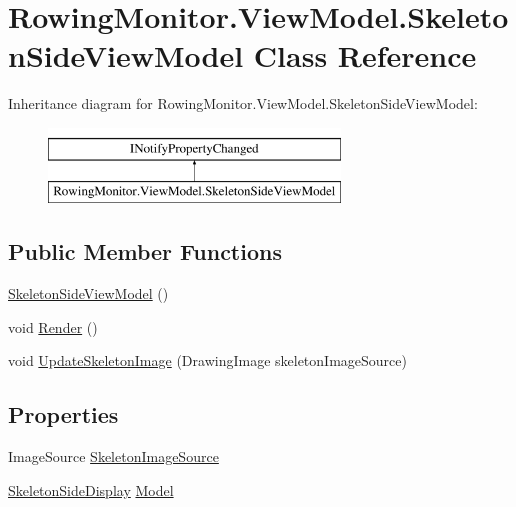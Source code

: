 \hypertarget{class_rowing_monitor_1_1_view_model_1_1_skeleton_side_view_model}{}\section{Rowing\+Monitor.\+View\+Model.\+Skeleton\+Side\+View\+Model Class Reference}
\label{class_rowing_monitor_1_1_view_model_1_1_skeleton_side_view_model}
Inheritance diagram for Rowing\+Monitor.\+View\+Model.\+Skeleton\+Side\+View\+Model\+:\begin{figure}[H]
\begin{center}
\leavevmode
\includegraphics[height=2.000000cm]{class_rowing_monitor_1_1_view_model_1_1_skeleton_side_view_model}
\end{center}
\end{figure}
\subsection*{Public Member Functions}
\begin{DoxyCompactItemize}
\item 
\hyperlink{class_rowing_monitor_1_1_view_model_1_1_skeleton_side_view_model_aaf6f6d342b3351dfb98a8ba2a9936576}{Skeleton\+Side\+View\+Model} ()
\item 
void \hyperlink{class_rowing_monitor_1_1_view_model_1_1_skeleton_side_view_model_a3df8c93f7db5e5508fa9e219731aac91}{Render} ()
\item 
void \hyperlink{class_rowing_monitor_1_1_view_model_1_1_skeleton_side_view_model_a7dd65caa2dce80fa0761deb9601aabc1}{Update\+Skeleton\+Image} (Drawing\+Image skeleton\+Image\+Source)
\end{DoxyCompactItemize}
\subsection*{Properties}
\begin{DoxyCompactItemize}
\item 
Image\+Source \hyperlink{class_rowing_monitor_1_1_view_model_1_1_skeleton_side_view_model_a7e03d4603839dcdc9d5d4185b8deb496}{Skeleton\+Image\+Source}
\item 
\hyperlink{class_rowing_monitor_1_1_model_1_1_pipeline_1_1_skeleton_side_display}{Skeleton\+Side\+Display} \hyperlink{class_rowing_monitor_1_1_view_model_1_1_skeleton_side_view_model_a57efea54b412831f6940cd8e5e8c101e}{Model}
\end{DoxyCompactItemize}
